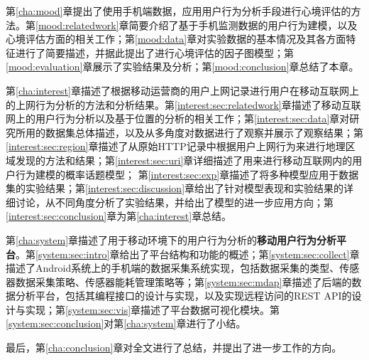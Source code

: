 第\ref{cha:mood}章提出了使用手机端数据，应用用户行为分析手段进行心境评估的方法。第\ref{mood:relatedwork}章简要介绍了基于手机监测数据的用户行为建模，以及心境评估方面的相关工作；第\ref{mood:data}章对实验数据的基本情况及其各方面特征进行了简要描述，并据此提出了进行心境评估的因子图模型；第\ref{mood:evaluation}章展示了实验结果及分析；第\ref{mood:conclusion}章总结了本章。

第\ref{cha:interest}章描述了根据移动运营商的用户上网记录进行用户在移动互联网上的上网行为分析的方法和分析结果。第\ref{interest:sec:relatedwork}章描述了移动互联网上的用户行为分析以及基于位置的分析的相关工作；第\ref{interest:sec:data}章对研究所用的数据集总体描述，以及从多角度对数据进行了观察并展示了观察结果；第\ref{interest:sec:region}章描述了从原始HTTP记录中根据用户上网行为来进行地理区域发现的方法和结果；第\ref{interest:sec:uri}章详细描述了用来进行移动互联网内的用户行为建模的概率话题模型； 第\ref{interest:sec:exp}章描述了将多种模型应用于数据集的实验结果；第\ref{interest:sec:discussion}章给出了针对模型表现和实验结果的详细讨论，从不同角度分析了实验结果，并给出了模型的进一步应用方向；第\ref{interest:sec:conclusion}章为第\ref{cha:interest}章总结。

第\ref{cha:system}章描述了用于移动环境下的用户行为分析的\textbf{移动用户行为分析平台}。第\ref{system:sec:intro}章给出了平台结构和功能的概述；第\ref{system:sec:collect}章描述了Android系统上的手机端的数据采集系统实现，包括数据采集的类型、传感器数据采集策略、传感器能耗管理策略等；第\ref{system:sec:mdap}章描述了后端的数据分析平台，包括其编程接口的设计与实现，以及实现远程访问的REST API的设计与实现；第\ref{system:sec:vis}章描述了平台数据可视化模块。第\ref{system:sec:conclusion}对第\ref{cha:system}章进行了小结。

最后，第\ref{cha:conclusion}章对全文进行了总结，并提出了进一步工作的方向。

